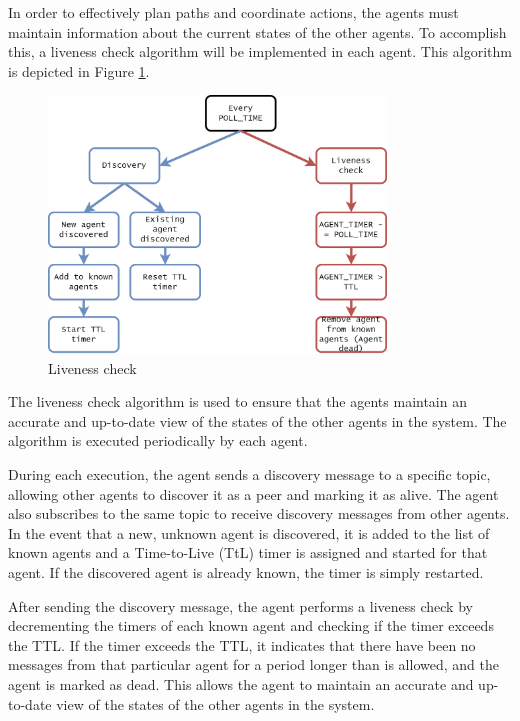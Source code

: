 In order to effectively plan paths and coordinate actions, the agents must maintain information about the current states of the other agents. To accomplish this, a liveness check algorithm will be implemented in each agent. This algorithm is depicted in Figure \ref{fig:liveness_check}.
\begin{figure}[H]
    \centering
    \includegraphics[width=0.8\textwidth]{pictures/agent_ttl.png}
    \caption{Liveness check}
    \label{fig:liveness_check}
\end{figure}

The liveness check algorithm is used to ensure that the agents maintain an accurate and up-to-date view of the states of the other agents in the system. The algorithm is executed periodically by each agent.

During each execution, the agent sends a discovery message to a specific topic, allowing other agents to discover it as a peer and marking it as alive. The agent also subscribes to the same topic to receive discovery messages from other agents. In the event that a new, unknown agent is discovered, it is added to the list of known agents and a Time-to-Live (TtL) timer is assigned and started for that agent. If the discovered agent is already known, the timer is simply restarted.

After sending the discovery message, the agent performs a liveness check by decrementing the timers of each known agent and checking if the timer exceeds the TTL. If the timer exceeds the TTL, it indicates that there have been no messages from that particular agent for a period longer than is allowed, and the agent is marked as dead. This allows the agent to maintain an accurate and up-to-date view of the states of the other agents in the system.
